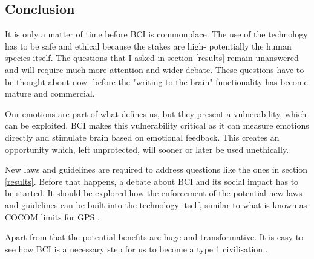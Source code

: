 \documentclass[fleqn,11pt]{olplainarticle}
\begin{document}
\subsection{Conclusion}
It is only a matter of time before BCI is commonplace. The use of the technology has to be safe and ethical because the stakes are high- potentially the human species itself. The questions that I asked in section \ref{results} remain unanswered and will require much more attention and wider debate. These questions have to be thought about now- before the "writing to the brain" functionality has become mature and commercial.

Our emotions are part of what defines us, but they present a vulnerability, which can be exploited. BCI makes this vulnerability critical as it can measure emotions directly and stimulate brain based on emotional feedback. This creates an opportunity which, left unprotected, will sooner or later be used unethically.

New laws and guidelines are required to address questions like the ones in section \ref{results}. Before that happens, a debate about BCI and its social impact has to be started. It should be explored how the enforcement of the potential new laws and guidelines can be built into the technology itself, similar to what is known as COCOM limits for GPS \cite{helmericks2001development}. 

Apart from that the potential benefits are huge and transformative. It is easy to see how BCI is a necessary step for us to become a type 1 civilisation \cite{gray2020extended}.

\printbibliography
\end{document}

